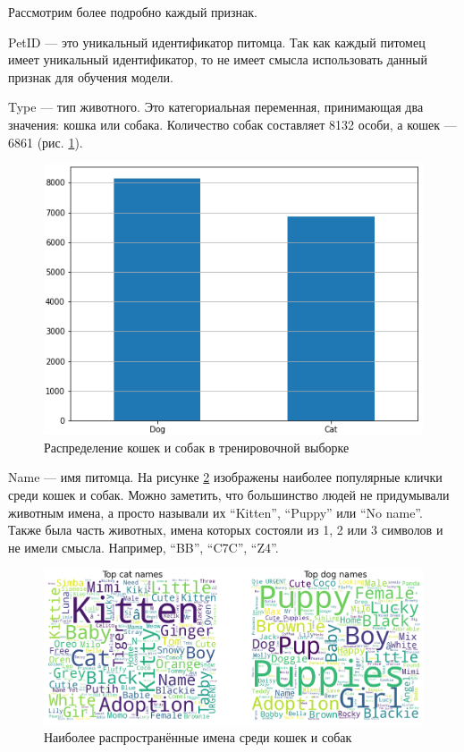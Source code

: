 \documentclass[14pt]{mmcs_article}
\begin{document}
Рассмотрим более подробно каждый признак.

PetID --- это уникальный идентификатор питомца. Так как каждый питомец имеет уникальный идентификатор, то не имеет смысла использовать данный признак для обучения модели.

Type --- тип животного. Это категориальная переменная, принимающая два значения: кошка или собака. Количество собак составляет 8132 особи, а кошек — 6861 (рис. \ref{analyse:type}).

\begin{figure}[H]
	\centering
	\includegraphics[scale=1.2]{type.png}
	\caption{Распределение кошек и собак в тренировочной выборке}\label{analyse:type}
\end{figure}

Name --- имя питомца. На рисунке \ref{analyse:names} изображены наиболее популярные клички среди кошек и собак. Можно заметить, что большинство людей не придумывали животным имена, а просто называли их “Kitten”, “Puppy” или “No name”. Также была часть животных, имена которых состояли из 1, 2 или 3 символов и не имели смысла. Например, “BB”, “C7C”, “Z4”. 

\begin{figure}[H]
	\centering
	\includegraphics[scale=0.45]{names.png}
	\caption{Наиболее распространённые имена среди кошек и собак}\label{analyse:names}
\end{figure}
\end{document}

